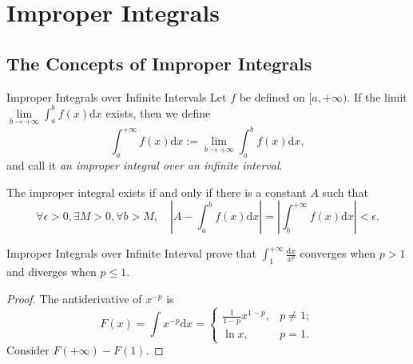 \section{Improper Integrals}

\subsection{The Concepts of Improper Integrals}

\begin{definition}{Improper Integrals over Infinite Intervals}{}
  Let $f$ be defined on $[a, +\infty)$.
  If the limit $\lim \limits _{b \rightarrow +\infty} \int_a^b f(x)\mathrm{d} x$
  exists,
  then we define
  \begin{equation}
    \int_a^{+\infty} f(x) \mathrm{d} x := \lim \limits _{b \rightarrow +\infty} \int_a^b f(x)\mathrm{d} x,
  \end{equation}
  and call it \emph{an improper integral over an infinite interval}.
\end{definition}

\begin{note}
  The improper integral exists if and only if
  there is a constant $A$ such that
  \begin{equation}
    \forall \epsilon > 0, \exists M > 0, \forall b > M,
    \quad
    \left| A - \int_a^b f(x)\mathrm{d} x  \right|
    = \left| \int_b^{+\infty} f(x)\mathrm{d} x \right|
    < \epsilon.
  \end{equation}
\end{note}

\begin{example}{Improper Integrals over Infinite Interval}{}
  prove that $\int_1^{+\infty} \frac{\mathrm{d}x}{x^p}$ converges when $p > 1$
  and diverges when $p \leq 1$.
\end{example}

\begin{proof}
  The antiderivative of $x^{-p}$ is
  \begin{equation}
    F(x) = \int x^{-p}\mathrm{d} x =
    \begin{cases}
      \frac{1}{1-p} x^{1-p}, & p \neq 1;\\
      \ln x, & p =1.
    \end{cases}
  \end{equation}
  Consider $F(+\infty) - F(1)$.
\end{proof}

